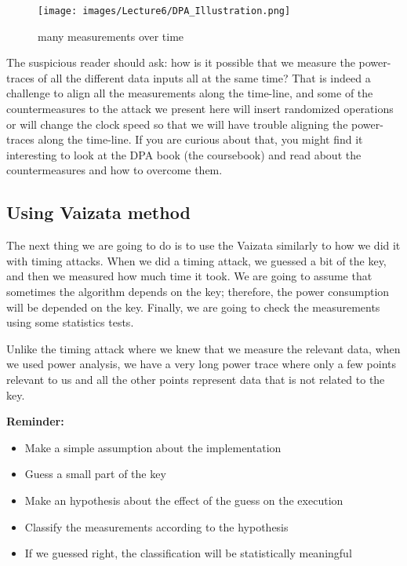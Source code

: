 \begin{figure}[!ht]
    \centering
    \texttt{[image: images/Lecture6/DPA\_Illustration.png]}
    \caption{many measurements over time} \label{fig:DPA_Illustration}
\end{figure}

The suspicious reader should ask: how is it possible that we measure the power-traces of all the different data inputs all at the same time? 
That is indeed a challenge to align all the measurements along the time-line, and some of the countermeasures to the attack we present here will insert randomized operations or will change the clock speed so that we will have trouble aligning the power-traces along the time-line. 
If you are curious about that, you might find it interesting to look at the DPA book (the coursebook) and read about the countermeasures and how to overcome them.

\subsection{Using Vaizata method}
The next thing we are going to do is to use the Vaizata similarly to how we did it with timing attacks. 
When we did a timing attack, we guessed a bit of the key, and then we measured how much time it took. 
We are going to assume that sometimes the algorithm depends on the key; therefore, the power consumption will be depended on the key. 
Finally, we are going to check the measurements using some statistics tests. 

Unlike the timing attack where we knew that we measure the relevant data, when we used power analysis, we have a very long power trace where only a few points relevant to us and all the other points represent data that is not related to the key.

\textbf{Reminder:}

\begin{itemize}
\item Make a {simple assumption} about the implementation
\item Guess a {small part} of the key
\item Make an {hypothesis} about the effect of the guess on the execution
\item {Classify the measurements} according to the hypothesis
\item If we guessed right, the classification will be {statistically meaningful}
\end{itemize}

